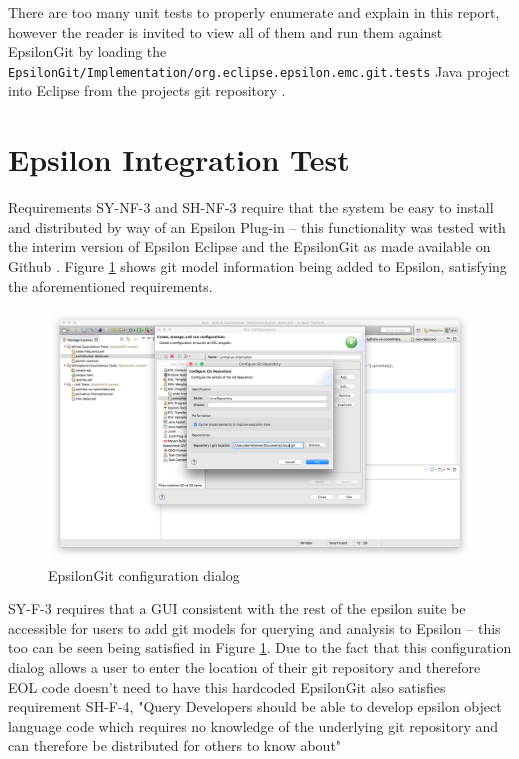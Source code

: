 \documentclass[11pt]{book}
\newcommand{\code}[1]{\texttt{#1}}
\begin{document}
There are too many unit tests to properly enumerate and explain in this report, however the reader is invited to view all of them and run them against EpsilonGit by loading the \\  \code{EpsilonGit/Implementation/org.eclipse.epsilon.emc.git.tests} Java project into Eclipse from the projects git repository \cite{epsilongitgithub}.

\section{Epsilon Integration Test}
\label{evalepsilonintegration}
Requirements SY-NF-3 and SH-NF-3 require that the system be easy to install and distributed by way of an Epsilon Plug-in -- this functionality was tested with the interim version of Epsilon Eclipse and the EpsilonGit as made available on Github \cite{epsilongitgithub}. Figure \ref{fig:epsilonintegration} shows git model information being added to Epsilon, satisfying the aforementioned requirements.

\begin{figure}[h]
	\centering
	\includegraphics[width=\textwidth]{images/epsilonintegration}
	\caption{EpsilonGit configuration dialog}
	\label{fig:epsilonintegration}
\end{figure}

SY-F-3 requires that a GUI consistent with the rest of the epsilon suite be accessible for users to add git models for querying and analysis to Epsilon -- this too can be seen being satisfied in Figure \ref{fig:epsilonintegration}. Due to the fact that this configuration dialog allows a user to enter the location of their git repository and therefore EOL code doesn't need to have this hardcoded EpsilonGit also satisfies requirement SH-F-4, "Query Developers should be able to develop epsilon object language code which requires no knowledge of the underlying git repository and can therefore be distributed for others to know about"
\end{document}
